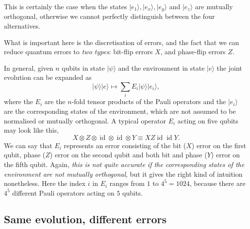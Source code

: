\documentclass{article}
\newenvironment{idea}%
{\bigskip\noindent\begin{minipage}{\textwidth}\smallskip\begin{tcolorbox}[colback=gray!10,boxrule=0.01mm]}%
{\end{tcolorbox}\end{minipage}\bigskip}
\begin{document}
This is certainly the case when the states \(|e_1\rangle, |e_x\rangle, |e_y\rangle\) and \(|e_z\rangle\) are mutually orthogonal, otherwise we cannot perfectly distinguish between the four alternatives.

\begin{idea}

What is important here is the discretisation of errors, and the fact that we can reduce quantum errors to \emph{two types}: bit-flip errors \(X\), and phase-flip errors \(Z\).

\end{idea}

In general, given \(n\) qubits in state \(|\psi\rangle\) and the environment in state \(|e\rangle\) the joint evolution can be expanded as
\[
|\psi\rangle|e\rangle \longmapsto \sum_i E_i|\psi\rangle|e_i\rangle,
\]
where the \(E_i\) are the \(n\)-fold tensor products of the Pauli operators and the \(|e_i\rangle\) are the corresponding states of the environment, which are not assumed to be normalised or mutually orthogonal.
A typical operator \(E_i\) acting on five qubits may look like this,
\[
  X\otimes Z \otimes \operatorname{id}\otimes \operatorname{id}\otimes Y
  \equiv XZ\operatorname{id}\operatorname{id}Y.
\]
We can say that \(E_i\) represents an error consisting of the bit (\(X\)) error on the first qubit, phase (\(Z\)) error on the second qubit and both bit and phase (\(Y\)) error on the fifth qubit.
Again, \emph{this is not quite accurate if the corresponding states of the environment are not mutually orthogonal}, but it gives the right kind of intuition nonetheless.
Here the index \(i\) in \(E_i\) ranges from \(1\) to \(4^5=1024\), because there are \(4^5\) different Pauli operators acting on \(5\) qubits.

\hypertarget{same-evolution-different-errors}{%
\subsection{Same evolution, different errors}\label{same-evolution-different-errors}}
\end{document}
